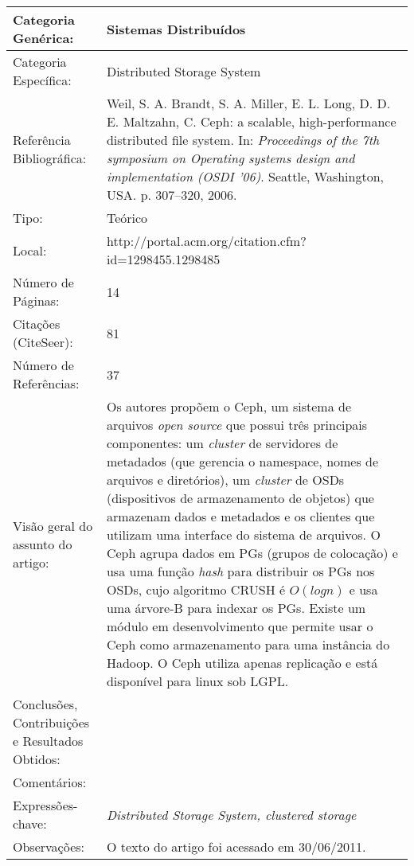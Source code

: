 \documentclass[10pt,a4paper]{article}
\begin{document}
\begin{center}
\begin{tabular}{|p{5cm}||p{10cm}|}
\hline

Categoria Genérica: & Sistemas Distribuídos\\\hline
Categoria Específica: & Distributed Storage System\\\hline
Referência Bibliográfica: & Weil, S. A. Brandt, S. A. Miller, E. L. Long, D. D. E. Maltzahn, C. Ceph: a scalable, high-performance distributed file system. In:  \emph{Proceedings of the 7th symposium on Operating systems design and implementation (OSDI '06)}. Seattle, Washington, USA. p. 307--320, 2006.\\\hline
Tipo: & Teórico\\\hline
Local: & http://portal.acm.org/citation.cfm?id=1298455.1298485\\\hline
Número de Páginas: & 14\\\hline
Citações (CiteSeer): & 81\\\hline
Número de Referências: & 37\\\hline
Visão geral do assunto do artigo: & Os autores propõem o Ceph, um sistema de arquivos \emph{open source} que possui três principais componentes: um \emph{cluster} de servidores de metadados (que gerencia o namespace, nomes de arquivos e diretórios), um \emph{cluster} de OSDs (dispositivos de armazenamento de objetos) que armazenam dados e metadados e os clientes que utilizam uma interface do sistema de arquivos. O Ceph agrupa dados em PGs (grupos de colocação) e usa uma função \emph{hash} para distribuir os PGs nos OSDs, cujo algoritmo CRUSH é $O(log n)$ e usa uma árvore-B para indexar os PGs. Existe um módulo em desenvolvimento que permite usar o Ceph como armazenamento para uma instância do Hadoop. O Ceph utiliza apenas replicação e está disponível para linux sob LGPL.\\\hline
Conclusões, Contribuições e Resultados Obtidos: &  \\\hline
Comentários: & \\\hline
Expressões-chave: & \emph{Distributed Storage System, clustered storage}\\\hline
Observações: & O texto do artigo foi acessado em 30/06/2011.\\\hline

\end{tabular}
\end{center}
\end{document}
